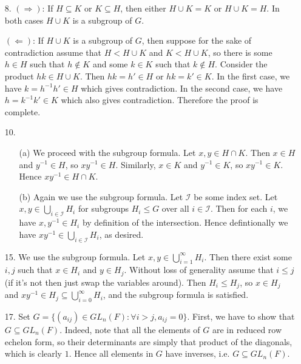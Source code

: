 \documentclass[12pt]{article}
\theoremstyle{remark}
\theoremstyle{named}
\begin{document}
\begin{enumerate}
    \item [8.] \((\Rightarrow)\): If \(H \subseteq K\) or \(K \subseteq H\), then either \(H \cup K = K\) or \(H \cup K = H\). In both cases \(H \cup K\) is a subgroup of \(G\).
    
    \((\Leftarrow)\): If \(H \cup K\) is a subgroup of \(G\), then suppose for the sake of contradiction assume that \(H < H \cup K\) and \(K < H \cup K\), so there is some \(h \in H\) such that \(h \notin K\) and some \(k \in K\) such that \(k \notin H\). Consider the product \(hk \in H \cup K\). Then \(hk = h' \in H\) or \(hk = k' \in K\). 
    In the first case, we have \(k = h^{-1}h' \in H\) which gives contradiction. In the second case, we have \(h = k^{-1}k' \in K\) which also gives contradiction. Therefore the proof is complete.

    \item [10.] 
    \begin{enumerate}
        \item [(a)] We proceed with the subgroup formula. Let \(x, y \in H \cap K\). Then \(x \in H\) and \(y^{-1} \in H\), so \(xy^{-1} \in H\). Similarly, \(x \in K\) and \(y^{-1} \in K\), so \(xy^{-1} \in K\). Hence \(xy^{-1} \in H \cap K\).
        
        \item [(b)] Again we use the subgroup formula. Let \(\mathcal I\) be some index set. Let \(x, y \in \bigcup_{i \in \mathcal I} H_i\) for subgroups \(H_i \le G\) over all \(i \in \mathcal I\). Then for each \(i\), we have \(x, y^{-1} \in H_i\) by definition of the intersection. Hence defintionally we have \(xy^{-1} \in \bigcup_{i \in \mathcal I} H_i\), as desired.
    \end{enumerate}

    \item [15.] We use the subgroup formula. Let \(x, y \in \bigcup_{i = 1}^\infty H_i\). Then there exist some \(i, j\) such that \(x \in H_i\) and \(y \in H_j\). Without loss of generality assume that \(i \le j\) (if it's not then just swap the variables around). Then \(H_i \le H_j\), so \(x \in H_j\) and \(xy^{-1} \in H_j \subseteq \bigcup_{i = 0}^\infty H_i\), and the subgroup formula is satisfied. 
    
    \item [17.] Set \(G = \{(a_{ij}) \in GL_n(F) : \forall i > j, a_{ij} = 0\}\). First, we have to show that \(G \subseteq GL_n(F)\). Indeed, note that all the elements of \(G\) are in reduced row echelon form, so their determinants are simply that product of the diagonals, which is clearly \(1\). Hence all elements in \(G\) have inverses, i.e. \(G \subseteq GL_n(F)\).
    

\end{enumerate}
\end{document}
